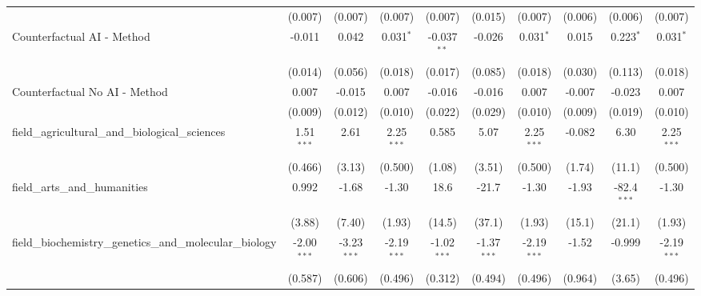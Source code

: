 \begin{tabular}{lccccccccc}
                                                               & (0.007)       & (0.007)        & (0.007)       & (0.007)       & (0.015)       & (0.007)       & (0.006)       & (0.006)        & (0.007)\\   
   Counterfactual AI - Method                                  & -0.011        & 0.042          & 0.031$^{*}$   & -0.037$^{**}$ & -0.026        & 0.031$^{*}$   & 0.015         & 0.223$^{*}$    & 0.031$^{*}$\\   
                                                               & (0.014)       & (0.056)        & (0.018)       & (0.017)       & (0.085)       & (0.018)       & (0.030)       & (0.113)        & (0.018)\\   
   Counterfactual No AI - Method                               & 0.007         & -0.015         & 0.007         & -0.016        & -0.016        & 0.007         & -0.007        & -0.023         & 0.007\\   
                                                               & (0.009)       & (0.012)        & (0.010)       & (0.022)       & (0.029)       & (0.010)       & (0.009)       & (0.019)        & (0.010)\\   
   field\_agricultural\_and\_biological\_sciences              & 1.51$^{***}$  & 2.61           & 2.25$^{***}$  & 0.585         & 5.07          & 2.25$^{***}$  & -0.082        & 6.30           & 2.25$^{***}$\\   
                                                               & (0.466)       & (3.13)         & (0.500)       & (1.08)        & (3.51)        & (0.500)       & (1.74)        & (11.1)         & (0.500)\\   
   field\_arts\_and\_humanities                                & 0.992         & -1.68          & -1.30         & 18.6          & -21.7         & -1.30         & -1.93         & -82.4$^{***}$  & -1.30\\   
                                                               & (3.88)        & (7.40)         & (1.93)        & (14.5)        & (37.1)        & (1.93)        & (15.1)        & (21.1)         & (1.93)\\   
   field\_biochemistry\_genetics\_and\_molecular\_biology      & -2.00$^{***}$ & -3.23$^{***}$  & -2.19$^{***}$ & -1.02$^{***}$ & -1.37$^{***}$ & -2.19$^{***}$ & -1.52         & -0.999         & -2.19$^{***}$\\   
                                                               & (0.587)       & (0.606)        & (0.496)       & (0.312)       & (0.494)       & (0.496)       & (0.964)       & (3.65)         & (0.496)\\   

\end{tabular}
